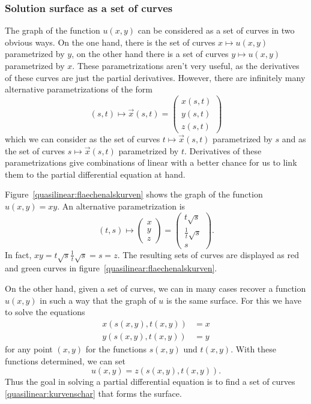 \subsubsection{Solution surface as a set of curves}
The graph of the function $u(x,y)$ can be considered as a set of curves
in two obvious ways.
On the one hand, there is the set of curves $x\mapsto u(x,y)$ parametrized
by $y$, on the other hand there is a set of curves $y\mapsto u(x,y)$
parametrized by $x$.
These parametrizations aren't very useful, as the derivatives of these
curves are just the partial derivatives.
However, there are infinitely many alternative parametrizations of the form
\begin{equation}
(s,t)\mapsto \vec x(s,t)
=
\begin{pmatrix}x(s,t)\\y(s,t)\\z(s,t)\end{pmatrix}
\label{quasilinear:kurvenschar}
\end{equation}
which we can consider as the set of curves $t\mapsto \vec x(s,t)$
parametrized by $s$ and as the set of curves $s\mapsto\vec x(s,t)$
parametrized by $t$.
Derivatives of these parametrizations give combinations of linear 
with a better chance for us to link them to the partial differential
equation at hand.

\begin{beispiel}
Figure~\ref{quasilinear:flaechenalskurven} shows the graph of the function
$u(x,y)=xy$.
An alternative parametrization is
\begin{equation}
(t,s)
\mapsto
\begin{pmatrix}x\\y\\z\end{pmatrix}
=
\begin{pmatrix}t\sqrt{s}\\\frac1t\sqrt{s}\\s\end{pmatrix}.
\label{quasliniear:flaechebeispiel}
\end{equation}
In fact, $xy = t\sqrt{s}\frac1t\sqrt{s}=s=z$.
The resulting sets of curves are displayed as red and green curves
in figure~\ref{quasilinear:flaechenalskurven}.
\end{beispiel}

On the other hand, given a set of curves, we can in many cases recover
a function $u(x,y)$ in such a way that the graph of $u$ is the same
surface.
For this we have to solve the equations
\begin{align*}
x(s(x,y),t(x,y))&=x\\
y(s(x,y),t(x,y))&=y
\end{align*}
for any point $(x,y)$ for the functions $s(x,y)$ und $t(x,y)$.
With these functions determined, we can set
\[
u(x,y)=z(s(x,y), t(x,y)).
\]
Thus the goal in solving a partial differential equation is to find
a set of curves \eqref{quasilinear:kurvenschar} that forms the surface.

